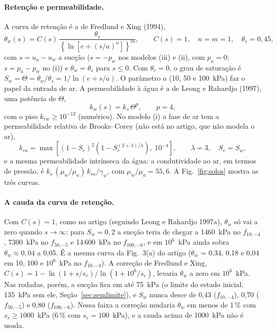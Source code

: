 \documentclass[11pt,a4paper]{article}
\begin{document}
\paragraph{Retenção e permeabilidade.} A curva de retenção é a de Fredlund e Xing (1994),
\begin{equation}
\theta_w(s) = C(s)\,\frac{\theta_s}{\left\{\ln\left[e + (s/a)^n\right]\right\}^m},
\qquad C(s) = 1,\quad n = m = 1,\quad \theta_s = 0{,}45,
\end{equation}
com $s = u_a - u_w$ a sucção ($s = -p_w$ nos modelos (iii) e (ii), com $p_a = 0$; $s = p_a - p_w$ no (i)) e
$\theta_w = \theta_s$ para $s \le 0$. Com $\theta_r = 0$, o grau de saturação é $S_w = \Theta = \theta_w/\theta_s =
1/\ln(e + s/a)$. O parâmetro $a$ (10, 50 e 100~kPa) faz o papel da entrada de ar. A permeabilidade à água é a de
Leong e Rahardjo (1997), uma potência de $\Theta$,
\begin{equation}
k_w(s) = k_s\,\Theta^p,\qquad p = 4,
\end{equation}
com o piso $k_{rw} \ge 10^{-12}$ (numérico). No modelo (i) a fase de ar tem a permeabilidade relativa de
Brooks--Corey (não está no artigo, que não modela o ar),
\begin{equation}
k_{ra} = \max\left[(1 - S_e)^2\left(1 - S_e^{(2+\lambda)/\lambda}\right),\ 10^{-4}\right],\qquad
\lambda = 3,\quad S_e = S_w,
\end{equation}
e a mesma permeabilidade intrínseca da água: a condutividade ao ar, em termos de pressão, é $k_s\,(\mu_w/\mu_a)\,k_{ra}/
\gamma_w$, com $\mu_w/\mu_a = 55{,}6$. A Fig.~\ref{fig:solos} mostra as três curvas.

\paragraph{A cauda da curva de retenção.} Com $C(s) = 1$, como no artigo (seguindo Leong e Rahardjo 1997a), $\theta_w$ só
vai a zero quando $s \to \infty$: para $S_w = 0{,}2$ a sucção teria de chegar a 1460~kPa no $f_{10,-4}$, 7300~kPa no
$f_{50,-5}$ e 14\,600~kPa no $f_{100,-6}$, e em $10^6$~kPa ainda sobra $\theta_w \approx 0{,}04$ a 0,05. É a mesma
curva da Fig.~3(a) do artigo ($\theta_w$ = 0,34, 0,18 e 0,04 em 10, 100 e $10^6$~kPa no $f_{10,-4}$). A correção de
Fredlund e Xing, $C(s) = 1 - \ln(1 + s/s_r)/\ln(1 + 10^6/s_r)$, levaria $\theta_w$ a zero em $10^6$~kPa. Nas rodadas,
porém, a sucção fica em até 75~kPa (o limite do estado inicial; 135~kPa sem ele, Seção~\ref{sec:semlimite}), e $S_w$
nunca desce de 0,43 ($f_{10,-4}$), 0,70 ($f_{50,-5}$) e 0,80 ($f_{100,-6}$). Nessa faixa a correção mudaria $\theta_w$
em menos de 1\,\% com $s_r \ge 1000$~kPa (6\,\% com $s_r = 100$~kPa), e a cauda acima de 1000~kPa não é usada.
\end{document}
